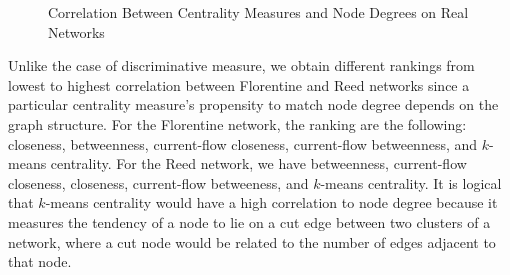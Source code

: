 \documentclass[10pt]{siamltex}
\begin{document}
\begin{pagewiselinenumbers}
\begin{figure}[h!!!]
\centering
{}
\caption{Correlation Between Centrality Measures and Node Degrees on Real Networks}
\label{fig:correlation}
\end{figure}

    Unlike the case of discriminative measure, we obtain different rankings from lowest to highest correlation between Florentine and Reed networks since a particular centrality measure's propensity to match node degree depends on the graph structure. For the Florentine network, the ranking are the following: closeness, betweenness, current-flow closeness, current-flow betweenness, and $k$-means centrality. For the Reed network, we have betweenness, current-flow closeness, closeness, current-flow betweeness, and $k$-means centrality. It is logical that $k$-means centrality would have a high correlation to node degree because it measures the tendency of a node to lie on a cut edge between two clusters of a network, where a cut node would be related to the number of edges adjacent to that node.


\end{pagewiselinenumbers}
\end{document}
